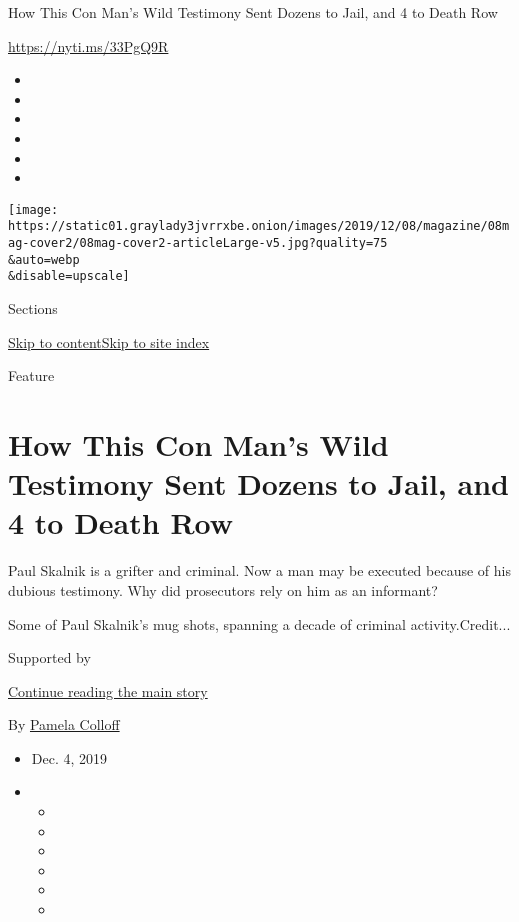 How This Con Man's Wild Testimony Sent Dozens to Jail, and 4 to Death
Row

\url{https://nyti.ms/33PgQ9R}

\begin{itemize}
\item
\item
\item
\item
\item
\item
\end{itemize}

\texttt{[image: https://static01.graylady3jvrrxbe.onion/images/2019/12/08/magazine/08mag-cover2/08mag-cover2-articleLarge-v5.jpg?quality=75\\\&auto=webp\\\&disable=upscale]}

Sections

\protect\hyperlink{site-content}{Skip to
content}\protect\hyperlink{site-index}{Skip to site index}

Feature

\hypertarget{how-this-con-mans-wild-testimony-sent-dozens-to-jail-and-4-to-death-row}{%
\section{How This Con Man's Wild Testimony Sent Dozens to Jail, and 4 to
Death
Row}\label{how-this-con-mans-wild-testimony-sent-dozens-to-jail-and-4-to-death-row}}

Paul Skalnik is a grifter and criminal. Now a man may be executed
because of his dubious testimony. Why did prosecutors rely on him as an
informant?

Some of Paul Skalnik's mug shots, spanning a decade of criminal
activity.Credit...

Supported by

\protect\hyperlink{after-sponsor}{Continue reading the main story}

By \href{https://www.nytimes3xbfgragh.onion/by/pamela-colloff}{Pamela
Colloff}

\begin{itemize}
\item
  Dec. 4, 2019
\item
  \begin{itemize}
  \item
  \item
  \item
  \item
  \item
  \item
  \end{itemize}
\end{itemize}

